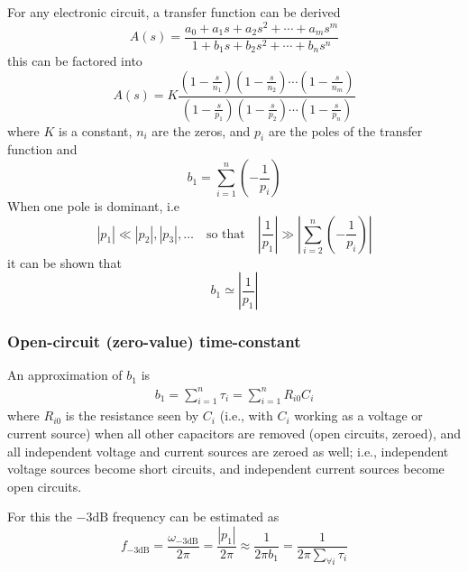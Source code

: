 \documentclass[12pt, a4paper]{article}%
\begin{document}
For any electronic circuit, a transfer function can be derived
\begin{equation}
A(s) = \frac{a_0 + a_1 s + a_2 s^2 + \cdots + a_m s^m}{1 + b_1 s + b_2 s^2 + \cdots + b_n s^n}
\end{equation}
this can be factored into
\begin{equation}
    A(s) = K \frac{\left( 1 - \frac{s}{n_1} \right) \left( 1 - \frac{s}{n_2} \right) \cdots \left( 1 - \frac{s}{n_m} \right)}{\left( 1 - \frac{s}{p_1} \right) \left( 1 - \frac{s}{p_2} \right) \cdots \left( 1 - \frac{s}{p_n} \right)} 
\end{equation}
where \( K \) is a constant, \(n_i\) are the zeros, and \( p_i\) are the poles of the transfer function and
\begin{equation}
b_1 = \sum_{i=1}^n \left( -\frac{1}{p_i} \right)
\end{equation}
When one pole is dominant, i.e
\begin{equation}
|p_1| \ll |p_2|, |p_3|, \ldots \quad \text{so that} \quad \left| \frac{1}{p_1} \right| \gg \left| \sum_{i=2}^n \left( -\frac{1}{p_i} \right) \right|
\end{equation}
it can be shown that
\begin{equation}
b_1 \simeq \left| \frac{1}{p_1} \right|
\end{equation}

\subsubsection{Open-circuit (zero-value) time-constant}
An approximation of \(b_1\) is 
\begin{align}
b_{1}=\sum_{i=1}^{n}\tau_{i}=\sum_{i=1}^{n}R_{i0}C_{i}
\end{align}
where $R_{i0}$ is the resistance seen by $C_i$ (i.e., with $C_i$ working as a voltage or current source) when all other capacitors are removed (open circuits, zeroed), and all independent voltage and current sources are zeroed as well; i.e., independent voltage sources become short circuits, and independent current sources become open circuits.

For this the \(-3\text{dB}\) frequency can be estimated as
\begin{equation}
    f_{-3\text{dB}} = \frac{\omega_{-3\text{dB}}}{2\pi} = \frac{|p_1|}{2\pi} \approx \frac{1}{2\pi b_1} = \frac{1}{2\pi \sum_{\forall i} \tau_i}
\end{equation}
\end{document}
